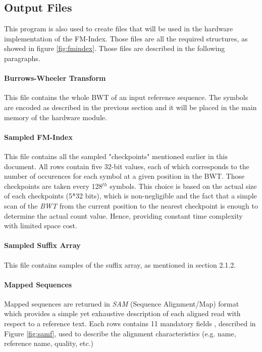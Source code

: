 \subsection{Output Files}

This program is also used to create files that will be used in the hardware implementation of the FM-Index. Those files are all the required structures, as showed in figure \ref{fig:fmindex}. Those files are described in the following paragraphs. 

\paragraph{Burrows-Wheeler Transform}

This file contains the whole BWT of an input reference sequence. The symbols are encoded as described in the previous section and it will be placed in the main memory of the hardware module.

\paragraph{Sampled FM-Index}

This file contains all the sampled "checkpoints" mentioned earlier in this document. All rows contain five 32-bit values, each of which corresponds to the number of occurences for each symbol at a given position in the BWT. Those checkpoints are taken every 128$^{th}$ symbols. This choice is based on the actual size of each checkpoints (5*32 bits), which is non-negligible and the fact that a simple scan of the \textit{BWT} from the current position to the nearest checkpoint is enough to determine the actual count value. Hence, providing constant time complexity with limited space cost.

\paragraph{Sampled Suffix Array}

This file contains samples of the suffix array, as mentioned in section 2.1.2.

\paragraph{Mapped Sequences}

Mapped sequences are returned in \textsl{SAM}  (Sequence Alignment/Map) format which provides a simple yet exhaustive description of each aligned read with respect to a reference text. Each rows contains 11 mandatory fields
, described in Figure \ref{fig:samf}, used to describe the alignment characteristics (e.g. name, reference name, quality, etc.) \\

